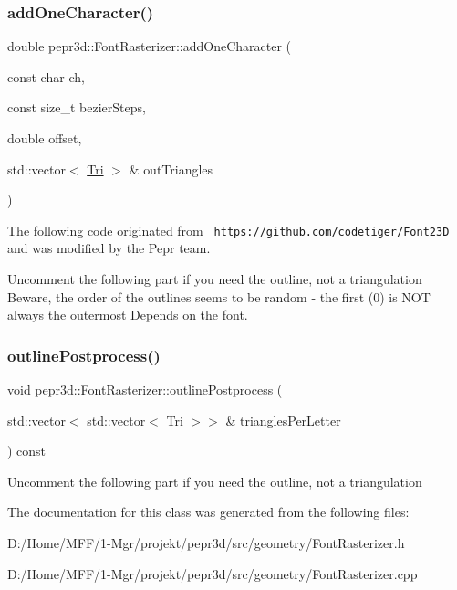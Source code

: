 \subsubsection{\texorpdfstring{addOneCharacter()}{addOneCharacter()}}
{\footnotesize\ttfamily double pepr3d\+::\+Font\+Rasterizer\+::add\+One\+Character (\begin{DoxyParamCaption}\item[{const char}]{ch,  }\item[{const size\+\_\+t}]{bezier\+Steps,  }\item[{double}]{offset,  }\item[{std\+::vector$<$ \mbox{\hyperlink{structpepr3d_1_1_font_rasterizer_1_1_tri}{Tri}} $>$ \&}]{out\+Triangles }\end{DoxyParamCaption})\hspace{0.3cm}{\ttfamily [private]}}



The following code originated from \href{https://github.com/codetiger/Font23D}{\texttt{ https\+://github.\+com/codetiger/\+Font23D}} and was modified by the Pepr team. 

Uncomment the following part if you need the outline, not a triangulation Beware, the order of the outlines seems to be random -\/ the first (0) is N\+OT always the outermost Depends on the font. \mbox{\label{classpepr3d_1_1_font_rasterizer_add285bc72f4611f6f74811978b877d68}} 
\subsubsection{\texorpdfstring{outlinePostprocess()}{outlinePostprocess()}}
{\footnotesize\ttfamily void pepr3d\+::\+Font\+Rasterizer\+::outline\+Postprocess (\begin{DoxyParamCaption}\item[{std\+::vector$<$ std\+::vector$<$ \mbox{\hyperlink{structpepr3d_1_1_font_rasterizer_1_1_tri}{Tri}} $>$$>$ \&}]{triangles\+Per\+Letter }\end{DoxyParamCaption}) const\hspace{0.3cm}{\ttfamily [private]}}

Uncomment the following part if you need the outline, not a triangulation 

The documentation for this class was generated from the following files\+:\begin{DoxyCompactItemize}
\item 
D\+:/\+Home/\+M\+F\+F/1-\/\+Mgr/projekt/pepr3d/src/geometry/Font\+Rasterizer.\+h\item 
D\+:/\+Home/\+M\+F\+F/1-\/\+Mgr/projekt/pepr3d/src/geometry/Font\+Rasterizer.\+cpp\end{DoxyCompactItemize}
